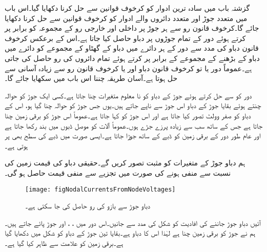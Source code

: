 گزشتہ باب میں سادہ ترین ادوار کو کرخوف قوانین سے حل کرنا دکھایا گیا۔اس باب میں متعدد جوڑ اور متعدد دائروں والے ادوار کو کرخوف قوانین سے حل کرنا دکھایا جائے گا۔کرخوف قانون رو سے ہر جوڑ پر داخلی اور خارجی رو کے مجموعہ کو برابر پر کرتے ہوئے دور کے تمام جوڑوں پر دباو حاصل کیا جاتا ہے۔اس کے برعکس کرخوف قانون دباو کی مدد سے دور کے ہر دائرے میں دباو کے گھٹاو کے مجموعے کو دائرے میں دباو کے  بڑھنے کے مجموعے کے برابر پر کرتے ہوئے تمام دائروں کی رو حاصل کی جاتی ہے۔عموماً  دور یا تو کرخوف قانون دباو اور یا کرخوف قانون رو سے زیادہ آسانی سے حل ہوتا ہے۔آسان طریقہ چننا اس باب میں سکھایا جائے گا۔

دور کو  سے حل کرتے ہوئے  جوڑ کے دباو کو  نا معلوم متغیرات چنا جاتا ہے۔کسی ایک جوڑ کو حوالہ چنتے ہوئے بقایا جوڑ کے دباو اس جوڑ سے ناپے جاتے ہیں۔یوں جس جوڑ کو حوالہ چنا گیا ہو، اس کے دباو کو صفر وولٹ تصور کیا جاتا ہے اور اس جوڑ کو   کہا جاتا ہے۔عموماً اس جوڑ کو برقی زمین چنا جاتا ہے جس کے ساتھ سب سے زیادہ پرزے جڑے ہوں۔عموماً آلات کو موصل ڈبوں میں بند رکھا جاتا ہے اور عام طور دور کے برقی زمین کو ڈبے کے ساتھ جوڑا جاتا ہے۔ایسی صورت میں ڈبے کی سطح  بھی  پر ہوتی ہے۔

ہم دباو جوڑ کے متغیرات کو مثبت تصور کریں گے۔حقیقی دباو کی قیمت زمین کی نسبت سے منفی ہونے کی صورت میں تجزیے سے منفی قیمت حاصل ہو گی۔ 

\begin{figure}
\centering
\texttt{[image: figNodalCurrentsFromNodeVoltages]}
\caption{دباو جوڑ سے بازو کی رو حاصل کی جا سکتی ہے۔}
\label{شکل_جوڑ_دباو__جوڑ_سے_رو_کا_حصول}
\end{figure}%

آئیں دباو جوڑ جاننے کی افادیت کو  شکل  کی مدد سے جانیں۔اس دور میں ، ،  اور  جوڑ پائے جاتے ہیں۔ہم نے جوڑ  کو برقی زمین چنا ہے لہٰذا اس کا دباو  ہے۔بقایا تین جوڑ کے دباو کو شکل میں دکھایا گیا ہے۔برقی زمین کو علامت سے ظاہر کیا گیا ہے۔

